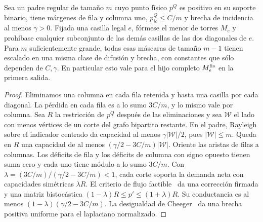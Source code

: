 \begin{lema}\label{lem:hijo-fisico}
Sea un padre regular de tamaño \(m\) cuyo punto físico \(p^{Q}\) es positivo en su soporte
binario, tiene márgenes de fila y columna uno, \(p^{Q}_{ic}\le C/m\) y brecha de incidencia
al menos \(\gamma>0\). Fijada una casilla legal \(e\), fórmese el menor de torres \(M_e\)
y prohíbase cualquier subconjunto de las demás casillas de las dos diagonales de \(e\).
Para \(m\) suficientemente grande, todas esas máscaras de tamaño \(m-1\) tienen escalado en
una misma clase de difusión y brecha, con constantes que sólo dependen de \(C,\gamma\).
En particular esto vale para el hijo completo \(M_e^{\rm fis}\) en la primera salida.
\end{lema}
\begin{proof}
Eliminamos una columna en cada fila retenida y hasta una casilla por cada diagonal.
La pérdida en cada fila es a lo sumo \(3C/m\), y lo mismo vale por columna. Sea \(R\) la
restricción de \(p^Q\) después de las eliminaciones y sea \(\mathcal W\) el lado con menos vértices
de un corte del grafo bipartito restante. En el padre, Rayleigh sobre el indicador centrado
da capacidad al menos \(\gamma |\mathcal W|/2\), pues \(|\mathcal W|\le m\).
Queda en \(R\) una capacidad de al menos \((\gamma/2-3C/m)|\mathcal W|\).
Oriente las aristas de filas a columnas. Los déficits de fila y los déficits de columna
con signo opuesto tienen suma cero y cada uno tiene módulo a lo sumo \(3C/m\).
Con \(\lambda=(3C/m)/(\gamma/2-3C/m)<1\), cada corte soporta la demanda neta
con capacidades simétricas \(\lambda R\). El criterio de flujo factible~\cite{gale} da una corrección
firmada
y una matriz bistocástica \((1-\lambda)R\le p'\le(1+\lambda)R\).
Su conductancia es al menos \((1-\lambda)(\gamma/2-3C/m)\). La desigualdad de Cheeger~\cite{lsok} da una
brecha
positiva uniforme para el laplaciano normalizado.


\end{proof}
